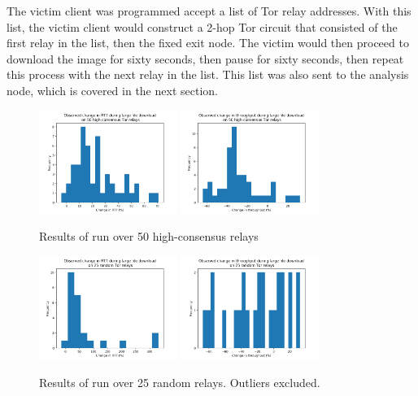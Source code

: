 \documentclass[12pt,journal]{IEEEtran}
\begin{document}
The victim client was programmed accept a list of Tor relay addresses. With this list, the victim client would construct a 2-hop Tor circuit that consisted of the first relay in the list, then the fixed exit node. The victim would then proceed to download the image for sixty seconds, then pause for sixty seconds, then repeat this process with the next relay in the list. This list was also sent to the analysis node, which is covered in the next section.

\begin{figure}
 \center
  \includegraphics[width=0.4\textwidth]{figures/rtt_guard.png}
  \includegraphics[width=0.4\textwidth]{figures/thr_guard.png}
  \caption{Results of run over 50 high-consensus relays}
  \label{AAA}
\end{figure}

\begin{figure}
 \center
  \includegraphics[width=0.4\textwidth]{figures/rtt_avg.png}
  \includegraphics[width=0.4\textwidth]{figures/thr_avg.png}
  \caption{Results of run over 25 random relays. Outliers excluded.}
  \label{AAA}
\end{figure}
\end{document}

